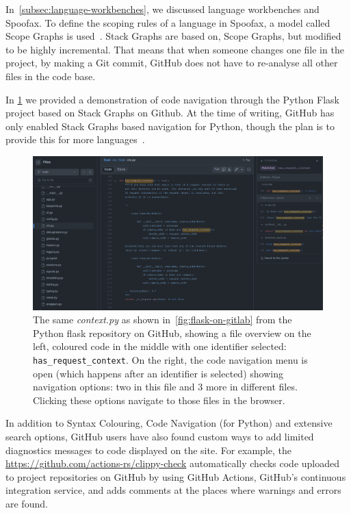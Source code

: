 In~\cref{subsec:language-workbenches}, we discussed language workbenches and Spoofax.
To define the scoping rules of a language in Spoofax, a model called Scope Graphs is used~\autocite{NeronTVW15, AntwerpenNTVW16, AntwerpenPRV18}.
Stack Graphs are based on, Scope Graphs, but modified to be highly incremental.
That means that when someone changes one file in the project, by making a Git commit, GitHub does not have to re-analyse all other files in the code base.

In \cref{fig:flask-on-github} we provided a demonstration of code navigation through the Python Flask project based on Stack Graphs on Github.
At the time of writing, GitHub has only enabled Stack Graphs based navigation for Python, though the plan is to provide this for more languages~\autocite{CreagerA23}.

\begin{figure}[!h]
    \centering
    \includegraphics[width=\textwidth]{../images/flask-github}
    \caption{
        The same \textit{context.py} as shown in~\cref{fig:flask-on-gitlab} from the Python flask repository on GitHub,
        showing a file overview on the left, coloured code in the middle with one identifier selected: \texttt{has\_request\_context}.
        On the right, the code navigation menu is open (which happens after an identifier is selected) showing navigation options:
        two in this file and 3 more in different files. Clicking these options navigate to those files in the browser.
    }
    \label{fig:flask-on-github}
\end{figure}

In addition to Syntax Colouring, Code Navigation (for Python) and extensive search options, GitHub users
have also found custom ways to add limited diagnostics messages to code displayed on the site.
For example, the \url{https://github.com/actions-rs/clippy-check} automatically checks code uploaded to project repositories on GitHub
by using GitHub Actions, GitHub's continuous integration service, and adds comments at the places where warnings and errors are found.


